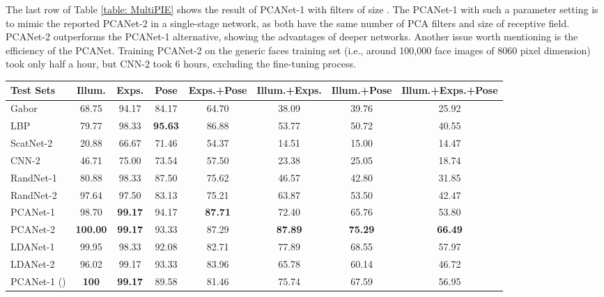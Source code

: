 \documentclass[10pt,journal,compsoc]{IEEEtran}
\begin{document}
The last row of Table \ref{table: MultiPIE} shows the result of PCANet-1 with  filters of size . The PCANet-1 with such a parameter setting is to mimic the reported PCANet-2 in a single-stage network, as both have the same number of PCA filters and size of receptive field. PCANet-2 outperforms the PCANet-1 alternative, showing the advantages of deeper networks. Another issue worth mentioning is the efficiency of the PCANet. Training PCANet-2 on the generic faces training set (i.e., around 100,000 face images of 8060 pixel dimension) took only half a hour, but CNN-2 took 6 hours, excluding the fine-tuning process.


\begin{table*}\centering
\caption{Comparison of face recognition rates  of various methods on MultiPIE test sets. The filter size  are set in RandNet, PCANet, and LDANet unless specified otherwise.}
\vspace{0.1cm}\begin{tabular}{l|c|c|c|c|c|c|c}
  \hline
Test Sets & Illum. & Exps. & Pose & Exps.+Pose & Illum.+Exps. & Illum.+Pose & Illum.+Exps.+Pose \\ \hline \hline
  Gabor \cite{Liu2002}   & 68.75  & 94.17 & 84.17 & 64.70 & 38.09 & 39.76 & 25.92 \\
  LBP  \cite{Ahonen2006}   & 79.77 & 98.33 & {\bf 95.63} & 86.88 & 53.77 & 50.72 & 40.55 \\
  ScatNet-2 \cite{Bruna2013} & 20.88 & 66.67 & 71.46 & 54.37 & 14.51 & 15.00 & 14.47 \\
  CNN-2 \cite{Krizhevsky2012} & 46.71 & 75.00 & 73.54 & 57.50 & 23.38 & 25.05 & 18.74 \\  \hline
RandNet-1 &    80.88  &    98.33   &    87.50     &     75.62   &       46.57     &     42.80    &       31.85 \\
  RandNet-2 &      97.64  &    97.50   &    83.13    &      75.21    &      63.87    &      53.50  &         42.47 \\
  PCANet-1   & 98.70 & {\bf 99.17} & 94.17 & {\bf 87.71} & 72.40 & 65.76 & 53.80 \\
  PCANet-2   & {\bf 100.00} & {\bf  99.17} & 93.33 & 87.29 & {\bf 87.89} & {\bf 75.29} & {\bf 66.49} \\
  LDANet-1   &  99.95  &    98.33   &    92.08   &       82.71     &     77.89   &       68.55    &       57.97    \\
  LDANet-2   & 96.02  &    99.17  &     93.33    &      83.96    &      65.78    &      60.14      &     46.72    \\ \hline
  PCANet-1 () & {\bf 100}  & {\bf 99.17} & 89.58 &  81.46 & 75.74 & 67.59 & 56.95  \\
  \hline
\end{tabular}\label{table: MultiPIE}
\end{table*}
\end{document}
